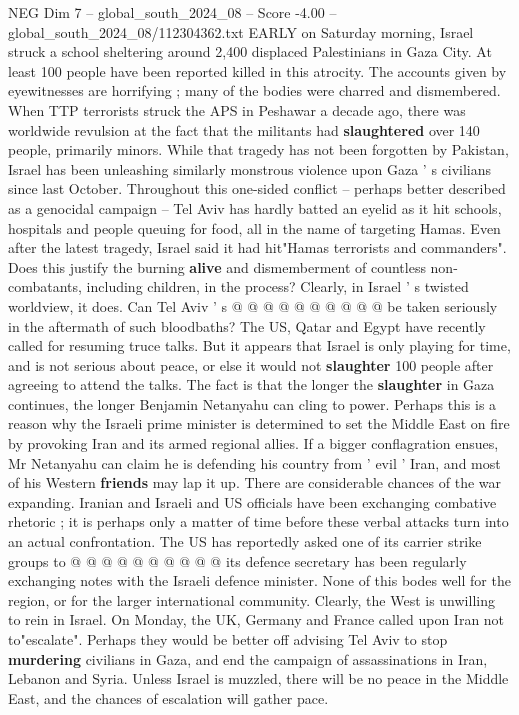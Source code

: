 \begin{textsample}{NEG Dim 7 – global\_south\_2024\_08 – Score -4.00 – global\_south\_2024\_08/112304362.txt}  \label{ex:f7_neg_376}
EARLY on Saturday morning, Israel struck a school sheltering around 2,400 displaced Palestinians in Gaza City.
At least 100 people have been reported killed in this atrocity.
The accounts given by eyewitnesses are horrifying ; many of the bodies were charred and dismembered.
When TTP terrorists struck the APS in Peshawar a decade ago, there was worldwide revulsion at the fact that the militants had \textbf{slaughtered} over 140 people, primarily minors.
While that tragedy has not been forgotten by Pakistan, Israel has been unleashing similarly monstrous violence upon Gaza ' s civilians since last October.
Throughout this one-sided conflict -- perhaps better described as a genocidal campaign -- Tel Aviv has hardly batted an eyelid as it hit schools, hospitals and people queuing for food, all in the name of targeting Hamas.
Even after the latest tragedy, Israel said it had hit"Hamas terrorists and commanders".
Does this justify the burning \textbf{alive} and dismemberment of countless non-combatants, including children, in the process?
Clearly, in Israel ' s twisted worldview, it does.
Can Tel Aviv ' s @ @ @ @ @ @ @ @ @ @ be taken seriously in the aftermath of such bloodbaths?
The US, Qatar and Egypt have recently called for resuming truce talks.
But it appears that Israel is only playing for time, and is not serious about peace, or else it would not \textbf{slaughter} 100 people after agreeing to attend the talks.
The fact is that the longer the \textbf{slaughter} in Gaza continues, the longer Benjamin Netanyahu can cling to power.
Perhaps this is a reason why the Israeli prime minister is determined to set the Middle East on fire by provoking Iran and its armed regional allies.
If a bigger conflagration ensues, Mr Netanyahu can claim he is defending his country from ' evil ' Iran, and most of his Western \textbf{friends} may lap it up.
There are considerable chances of the war expanding.
Iranian and Israeli and US officials have been exchanging combative rhetoric ; it is perhaps only a matter of time before these verbal attacks turn into an actual confrontation.
The US has reportedly asked one of its carrier strike groups to @ @ @ @ @ @ @ @ @ @ its defence secretary has been regularly exchanging notes with the Israeli defence minister.
None of this bodes well for the region, or for the larger international community.
Clearly, the West is unwilling to rein in Israel.
On Monday, the UK, Germany and France called upon Iran not to"escalate".
Perhaps they would be better off advising Tel Aviv to stop \textbf{murdering} civilians in Gaza, and end the campaign of assassinations in Iran, Lebanon and Syria.
Unless Israel is muzzled, there will be no peace in the Middle East, and the chances of escalation will gather pace.

\end{textsample}
